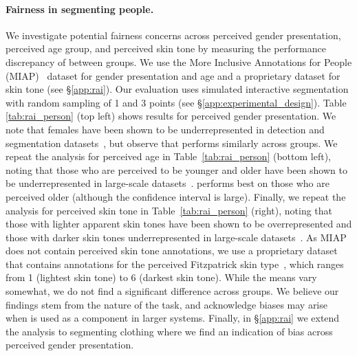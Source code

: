 \paragraph{Fairness in segmenting people.} We investigate potential fairness concerns across perceived gender presentation, perceived age group, and perceived skin tone by measuring the performance discrepancy of \sam between groups. We use the More Inclusive Annotations for People (MIAP)~\cite{schumann2021step} dataset for gender presentation and age and a proprietary dataset for skin tone (see \S\ref{app:rai}). Our evaluation uses simulated interactive segmentation with random sampling of 1 and 3 points (see \S\ref{app:experimental_design}). Table \ref{tab:rai_person} (top left) shows results for perceived gender presentation. We note that females have been shown to be underrepresented in detection and segmentation datasets~\cite{zhao2017}, but observe that \sam performs similarly across groups. We repeat the analysis for perceived age in Table~\ref{tab:rai_person} (bottom left), noting that those who are perceived to be younger and older have been shown to be underrepresented in large-scale datasets~\cite{yang2020towards}. \sam performs best on those who are perceived older (although the confidence interval is large). Finally, we repeat the analysis for perceived skin tone in Table~\ref{tab:rai_person} (right), noting that those with lighter apparent skin tones have been shown to be overrepresented and those with darker skin tones underrepresented in large-scale datasets~\cite{yang2020towards}. As MIAP does not contain perceived skin tone annotations, we use a proprietary dataset that contains annotations for the perceived Fitzpatrick skin type~\cite{fitzpatrick1988}, which ranges from 1 (lightest skin tone) to 6 (darkest skin tone). While the means vary somewhat, we do not find a significant difference across groups. We believe our findings stem from the nature of the task, and acknowledge biases may arise when \sam is used as a component in larger systems. Finally, in \S\ref{app:rai} we extend the analysis to segmenting clothing where we find an indication of bias across perceived gender presentation.

